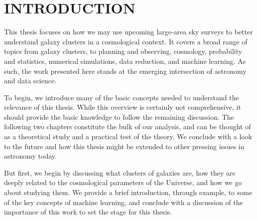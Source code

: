 %
%
%



\pagestyle{plain} %
\setcounter{page}{1}


\chapter[\uppercase{Introduction}]{\uppercase{Introduction}}

This thesis focuses on how we may use upcoming large-area sky surveys to better understand galaxy clusters in a cosmological context. It covers a broad range of topics from galaxy clusters, to planning and observing, cosmology, probability and statistics, numerical simulations, data reduction, and machine learning. As such, the work presented here stands at the emerging intersection of astronomy and data science.

To begin, we introduce many of the basic concepts needed to understand the relevance of this thesis. While this overview is certainly not comprehensive, it should provide the basic knowledge to follow the remaining discussion. The following two chapters constitute the bulk of our analysis, and can be thought of as a theoretical study and a practical test of the theory. We conclude with a look to the future and how this thesis might be extended to other pressing issues in astronomy today.

But first, we begin by discussing what clusters of galaxies are, how they are deeply related to the cosmological parameters of the Universe, and how we go about studying them. We provide a brief introduction, through example, to some of the key concepts of machine learning, and conclude with a discussion of the importance of this work to set the stage for this thesis.

